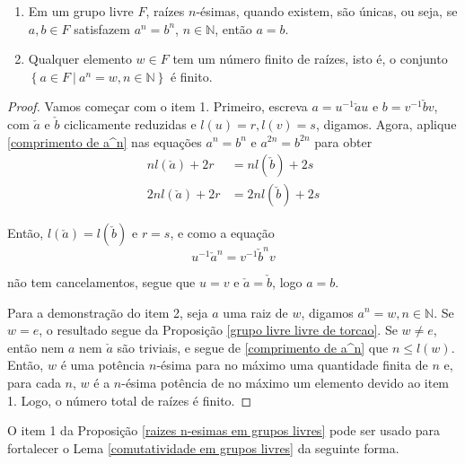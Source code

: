 	\begin{prop}
		\label{raizes n-esimas em grupos livres}
		\begin{enumerate}
			\item Em um grupo livre $F$, raízes $n$-ésimas, quando existem, são únicas, ou seja, se $a,b\in F$ satisfazem $a^n = b^n$, $n\in\mathbb{N}$, então $a = b$.
			\item Qualquer elemento $w\in F$ tem um número finito de raízes, isto é, o conjunto $\left\{ a\in F \ \vert \ a^n = w, n\in\mathbb{N} \right\}$ é finito.
		\end{enumerate}
	\end{prop}
	\begin{proof} Vamos começar com o item 1. Primeiro, escreva $a = u^{-1}\check{a}u$ e $b = v^{-1}\check{b}v$, com $\check{a}$ e $\check{b}$ ciclicamente reduzidas e $l(u) = r, l(v) = s$, digamos. Agora, aplique \eqref{comprimento de a^n} nas equações $a^n = b^n$ e $a^{2n} = b^{2n}$ para obter
		\begin{align*}
		nl(\check{a}) + 2r &= nl(\check{b}) + 2s \\
		2nl(\check{a}) + 2r &= 2nl(\check{b}) + 2s
		\end{align*}
		\par\vspace{0.3cm} Então, $l(\check{a}) = l(\check{b})$ e $r=s$, e como a equação
		\begin{equation*}
		u^{-1}\check{a}^n = v^{-1}\check{b}^nv
		\end{equation*}
		\par\vspace{0.3cm} não tem cancelamentos, segue que $u = v$ e $\check{a} = \check{b}$, logo $a=b$.
		\par\vspace{0.3cm} Para a demonstração do item 2, seja $a$ uma raiz de $w$, digamos $a^n = w, n\in\mathbb{N}$. Se $w = e$, o resultado segue da Proposição \eqref{grupo livre livre de torcao}. Se $w\neq e$, então nem $a$ nem $\check{a}$ são triviais, e segue de \eqref{comprimento de a^n} que $n\leq l(w)$. Então, $w$ é uma potência $n$-ésima para no máximo uma quantidade finita de $n$ e, para cada $n$, $w$ é a $n$-ésima potência de no máximo um elemento devido ao item 1. Logo, o número total de raízes é finito.
	\end{proof}
	\par\vspace{0.3cm} O item 1 da Proposição \eqref{raizes n-esimas em grupos livres} pode ser usado para fortalecer o Lema \eqref{comutatividade em grupos livres} da seguinte forma.
